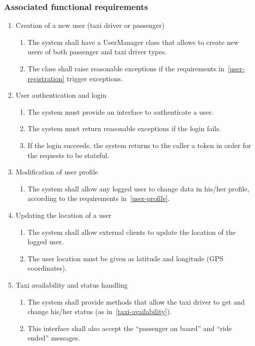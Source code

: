 \subsubsection{Associated functional requirements}
\begin{enumerate}
\item Creation of a new user (taxi driver or passenger)
\begin{enumerate}
    \item The system shall have a UserManager class that allows to create new users of both passenger and taxi driver types.
    \item The class shall raise reasonable exceptions if the requirements in~\autoref{user-registration} trigger exceptions.
\end{enumerate}
\item User authentication and login
\begin{enumerate}
    \item The system must provide an interface to authenticate a user.
    \item The system must return reasonable exceptions if the login fails.
    \item If the login succeeds, the system returns to the caller a token in order for the requests to be stateful.
\end{enumerate}
\item Modification of user profile
\begin{enumerate}
    \item The system shall allow any logged user to change data in his/her profile, according to the requirements in~\autoref{user-profile}.
\end{enumerate}
\item Updating the location of a user
\begin{enumerate}
    \item The system shall allow external clients to update the location of the logged user.
    \item The user location must be given as latitude and longitude (GPS coordinates).
\end{enumerate}
\item Taxi availability and status handling
\begin{enumerate}
    \item The system shall provide methods that allow the taxi driver to get and change his/her status (as in~\autoref{taxi-availability}).
    \item This interface shall also accept the ``passenger on board'' and ``ride ended'' messages.

\end{enumerate}
\end{enumerate}
